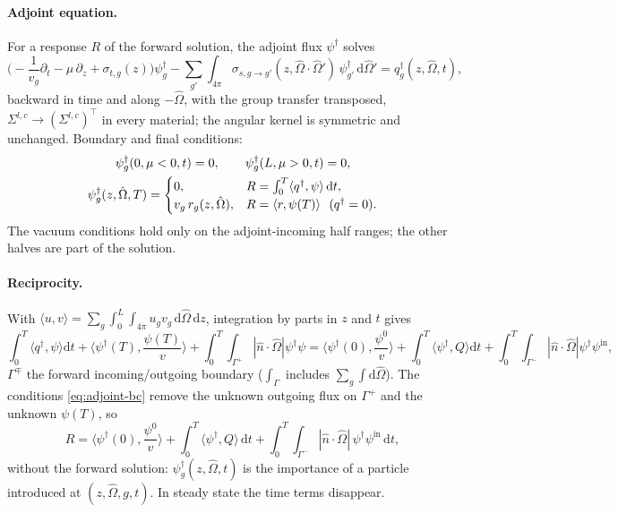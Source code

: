 \documentclass[11pt,a4paper]{article}
\newcommand{\Om}{\hat{\Omega}}
\newcommand{\dd}{\mathrm{d}}
\begin{document}
\paragraph{Adjoint equation.} For a response $R$ of the forward solution, the adjoint flux $\psi^\dagger$ solves
\begin{equation}
\Big(-\frac{1}{v_g}\partial_t-\mu\,\partial_z+\sigma_{t,g}(z)\Big)\psi^\dagger_g
-\sum_{g'}\int_{4\pi}\sigma_{s,g\to g'}(z,\Om\cdot\Om')\,\psi^\dagger_{g'}\,\dd\Om'=q^\dagger_g(z,\Om,t),
\label{eq:adjoint}
\end{equation}
backward in time and along $-\Om$, with the group transfer transposed, $\Sigma^{l,c}\to(\Sigma^{l,c})^{\!\top}$ in every material; the angular kernel is symmetric and unchanged. Boundary and final conditions:
\begin{gather}
\psi^\dagger_g(0,\mu<0,t)=0,\qquad\psi^\dagger_g(L,\mu>0,t)=0,\notag\\
\psi^\dagger_g(z,\Om,T)=\begin{cases}0,&R=\int_0^T\langle q^\dagger,\psi\rangle\,\dd t,\\ v_g\,r_g(z,\Om),&R=\langle r,\psi(T)\rangle\ \ (q^\dagger=0).\end{cases}
\label{eq:adjoint-bc}
\end{gather}
The vacuum conditions hold only on the adjoint-incoming half ranges; the other halves are part of the solution.

\paragraph{Reciprocity.} With $\langle u,v\rangle=\sum_g\int_0^L\!\int_{4\pi}u_gv_g\,\dd\Om\,\dd z$, integration by parts in $z$ and $t$ gives
\begin{equation}
\int_0^T\!\!\langle q^\dagger,\psi\rangle\dd t+\Big\langle\psi^\dagger(T),\frac{\psi(T)}{v}\Big\rangle+\!\int_0^T\!\!\!\int_{\Gamma^+}\!\!|\hat n\cdot\Om|\psi^\dagger\psi
=\Big\langle\psi^\dagger(0),\frac{\psi^0}{v}\Big\rangle+\int_0^T\!\!\langle\psi^\dagger,Q\rangle\dd t+\!\int_0^T\!\!\!\int_{\Gamma^-}\!\!|\hat n\cdot\Om|\psi^\dagger\psi^{\mathrm{in}},
\end{equation}
$\Gamma^\mp$ the forward incoming/outgoing boundary ($\int_\Gamma$ includes $\sum_g\int\dd\Om$). The conditions \eqref{eq:adjoint-bc} remove the unknown outgoing flux on $\Gamma^+$ and the unknown $\psi(T)$, so
\begin{equation}
R=\Big\langle\psi^\dagger(0),\frac{\psi^0}{v}\Big\rangle+\int_0^T\!\langle\psi^\dagger,Q\rangle\,\dd t+\int_0^T\!\!\!\int_{\Gamma^-}|\hat n\cdot\Om|\,\psi^\dagger\psi^{\mathrm{in}}\,\dd t ,
\label{eq:reciprocity}
\end{equation}
without the forward solution: $\psi^\dagger_g(z,\Om,t)$ is the importance of a particle introduced at $(z,\Om,g,t)$. In steady state the time terms disappear.
\end{document}
